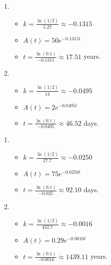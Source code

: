 \documentclass{ximera}
\begin{document}
\begin{multicols}{2}
\begin{enumerate}
\setcounter{enumi}{\value{HW}}
\addtocounter{enumi}{1}

\item  \begin{itemize}  \item $k = \frac{\ln(1/2)}{5.27} \approx -0.1315$

\item $A(t) = 50e^{-0.1315t}$

\item  $t = \frac{\ln(0.1)}{-0.1315} \approx 17.51$ years.

\end{itemize}



\item  \begin{itemize}  \item $k = \frac{\ln(1/2)}{14} \approx -0.0495$

\item $A(t) = 2e^{-0.0495t}$

\item  $t = \frac{\ln(0.1)}{-0.0495} \approx 46.52$ days.

\end{itemize}

\setcounter{HW}{\value{enumi}}
\end{enumerate}
\end{multicols}

\begin{multicols}{2}
\begin{enumerate}
\setcounter{enumi}{\value{HW}}


\item  \begin{itemize}  \item $k = \frac{\ln(1/2)}{27.7} \approx -0.0250$

\item $A(t) = 75e^{-0.0250t}$

\item  $t = \frac{\ln(0.1)}{-0.025} \approx 92.10$ days.

\end{itemize}

\item  \begin{itemize}  \item $k = \frac{\ln(1/2)}{432.7} \approx -0.0016$

\item $A(t) = 0.29e^{-0.0016t}$

\item  $t = \frac{\ln(0.1)}{-0.0016} \approx 1439.11$ years.

\end{itemize}


\setcounter{HW}{\value{enumi}}
\end{enumerate}
\end{multicols}
\end{document}
